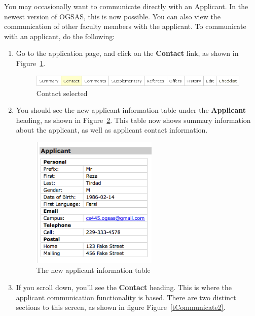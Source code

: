 \documentclass[titlepage]{article}
\begin{document}
You may occasionally want to communicate directly with an Applicant. In the newest version of OGSAS, this is now possible. You can also view the communication of other faculty members with the applicant. To communicate with an applicant, do the following:

\begin{enumerate}
\item Go to the application page, and click on the \textbf{\textsf{Contact}} link, as shown in Figure~\ref{tCommunicate0}.

\begin{figure}[h!]
  \begin{center}
  \includegraphics[width=13cm]{apptabs_contact.png}
  \end{center}
  \caption{Contact selected}
  \label{tCommunicate0}
\end{figure}

\item You should see the new applicant information table under the \textbf{\textsf{Applicant}} heading, as shown in Figure~\ref{tCommunicate1}. This table now shows summary information about the applicant, as well as applicant contact information.

\begin{figure}[h!]
  \begin{center}
  \includegraphics[width=6cm]{applicant_communication1.png}
  \end{center}
  \caption{The new applicant information table}
  \label{tCommunicate1}
\end{figure}

\item If you scroll down, you'll see the \textbf{\textsf{Contact}} heading. This is where the applicant communication functionality is based. There are two distinct sections to this screen, as shown in figure Figure~\ref{tCommunicate2}.


\end{enumerate}
\end{document}
